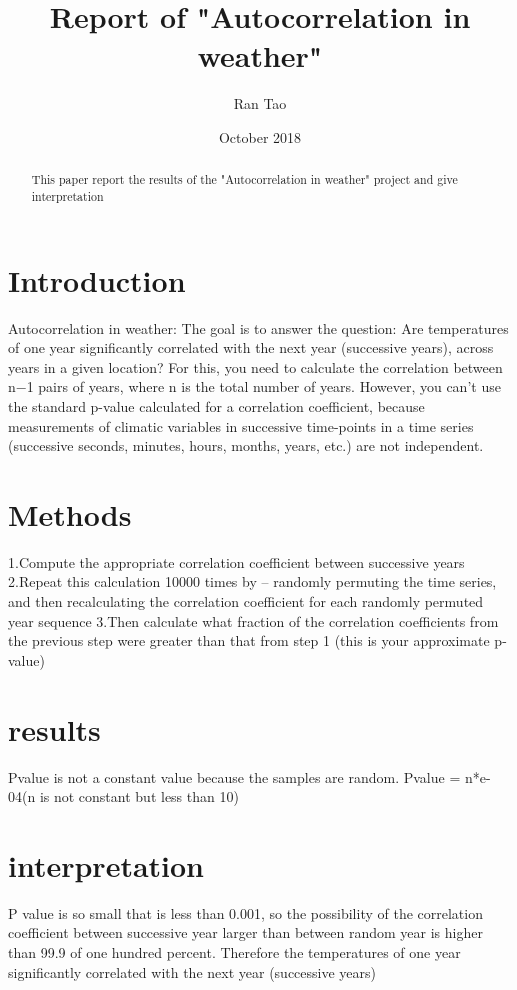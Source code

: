 \documentclass[12pt]{article}
\title{Report of "Autocorrelation in weather"}
\author{Ran Tao}
\date{October 2018}
\begin{document}
  \maketitle

  \begin{abstract}
    This paper report the results of the "Autocorrelation in weather" project and give interpretation
  \end{abstract}

  \section{Introduction}
    Autocorrelation in weather: The goal is to answer the question: Are temperatures of one year significantly correlated with the next year (successive years), across years in a given location? For this, you need to calculate the correlation between n−1 pairs of years, where n is the total number of years. However, you can't use the standard p-value calculated for a correlation coefficient, because measurements of climatic variables in successive time-points in a time series (successive seconds, minutes, hours, months, years, etc.) are not independent. 

  \section{Methods}
    1.Compute the appropriate correlation coefficient between successive years
    2.Repeat this calculation 10000 times by -- randomly permuting the time series, and then recalculating the correlation coefficient for each randomly permuted year sequence
    3.Then calculate what fraction of the correlation coefficients from the previous step were greater than that from step 1 (this is your approximate p-value)

  \section{results}
    Pvalue is not a constant value because the samples are random. Pvalue = n*e-04(n is not constant but less than 10)

  \section{interpretation}
    P value is so small that is less than 0.001, so the possibility of the correlation coefficient between successive year larger than between random year is higher than 99.9 of one hundred percent. Therefore the temperatures of one year significantly correlated with the next year (successive years) 
  
\end{document}
